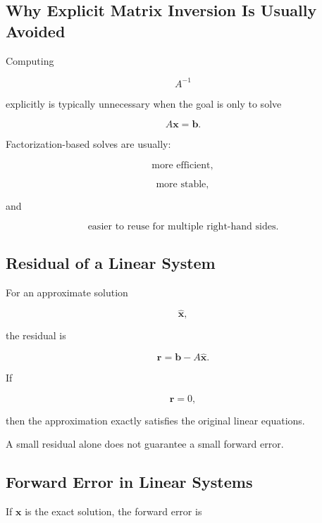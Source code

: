 \subsection{Why Explicit Matrix Inversion Is Usually Avoided}
\label{subsec:avoid-explicit-inverse}

Computing

\[
A^{-1}
\]

explicitly is typically unnecessary when the goal is only to solve

\[
A\mathbf{x}
=
\mathbf{b}.
\]

Factorization-based solves are usually:

\[
\boxed{
\text{more efficient},
}
\]

\[
\boxed{
\text{more stable},
}
\]

and

\[
\boxed{
\text{easier to reuse for multiple right-hand sides}.
}
\]

\subsection{Residual of a Linear System}
\label{subsec:linear-system-residual}

For an approximate solution

\[
\widehat{\mathbf{x}},
\]

the residual is

\[
\boxed{
\mathbf{r}
=
\mathbf{b}
-
A\widehat{\mathbf{x}}.
}
\]

If

\[
\mathbf{r}=0,
\]

then the approximation exactly satisfies the original linear equations.

A small residual alone does not guarantee a small forward error.

\subsection{Forward Error in Linear Systems}
\label{subsec:linear-system-forward-error}

If \(\mathbf{x}\) is the exact solution, the forward error is


